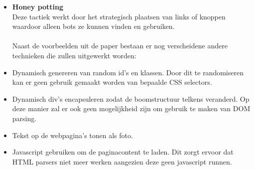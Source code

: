 \begin{itemize}
\item \textbf{Honey potting}
\\
Deze tactiek werkt door het strategisch plaatsen van  links of knoppen waardoor alleen bots ze kunnen vinden en gebruiken.
\textbf{}
\\
\\
Naast de voorbeelden uit de paper \cite{10.1007/978-3-030-90016-8_4} bestaan er nog verscheidene andere technieken die zullen uitgewerkt worden:
\item Dynamisch genereren van random id's en klassen. Door dit te randomiseren kan er geen gebruik gemaakt worden van bepaalde CSS selectors.
\item Dynamisch div's encapsuleren zodat de boomstructuur telkens veranderd. Op deze manier zal er ook geen mogelijkheid zijn om gebruik te maken van DOM parsing.
\item Tekst op de webpagina's tonen als foto.
\item Javascript gebruiken om de paginacontent te laden. Dit zorgt ervoor dat HTML parsers niet meer werken aangezien deze geen javascript runnen.
\end{itemize}






